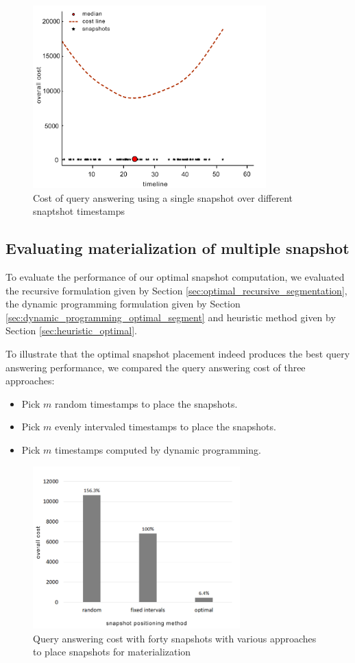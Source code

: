 			\begin{figure}
				\centering
				\includegraphics[width=90mm]{figs/single_snapshot.jpg}
				\caption{Cost of query answering using a single snapshot over different snaptshot timestamps}
				\label{fig:single_snapshot}
			\end{figure} 

		\subsection{Evaluating materialization of multiple snapshot} \label{evaluating_multiple_snapshots}
			To evaluate the performance of our optimal snapshot computation, we evaluated the recursive formulation given
			by Section \ref{sec:optimal_recursive_segmentation}, the dynamic programming formulation given by Section \ref{sec:dynamic_programming_optimal_segment} and heuristic method given by Section \ref{sec:heuristic_optimal}. 

			To illustrate that the optimal snapshot placement indeed produces the best query answering performance, we compared the query answering cost of three approaches:
			\begin{itemize}
				\item Pick $m$ random timestamps to place the snapshots.
				\item Pick $m$ evenly intervaled timestamps to place the snapshots.
				\item Pick $m$ timestamps computed by dynamic programming.
			\end{itemize}

			\begin{figure}
				\centering
				\includegraphics[width=80mm]{figs/various_scenarios_cost.jpg}
				\caption{Query answering cost with forty snapshots with various approaches to place snapshots for materialization}
				\label{fig:approaches_cost}
			\end{figure} 

